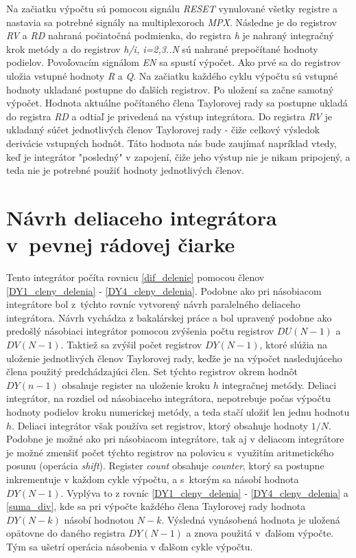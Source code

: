 Na začiatku výpočtu sú pomocou signálu \textit{RESET} vynulované všetky registre a nastavia sa potrebné signály na multiplexoroch \textit{MPX}. Následne je do registrov \textit{RV} a \textit{RD} nahraná počiatočná podmienka, do registra \textit{h} je nahraný integračný krok metódy a do registrov \textit{h/i, i=2,3..N} sú nahrané prepočítané hodnoty podielov. Povoľovacím signálom \textit{EN} sa spustí výpočet. Ako prvé sa do registrov uložia vstupné hodnoty \textit{R} a \textit{Q}. Na začiatku každého cyklu výpočtu sú vstupné hodnoty ukladané postupne do ďalších registrov. Po uložení sa začne samotný výpočet. Hodnota aktuálne počítaného člena Taylorovej rady sa postupne ukladá do registra \textit{RD} a odtiaľ je privedená na výstup integrátora.
Do registra \textit{RV} je ukladaný súčet jednotlivých členov Taylorovej rady - čiže celkový výsledok derivácie vstupných hodnôt. Táto hodnota nás bude zaujímať napríklad vtedy, keď je integrátor "posledný" v zapojení, čiže jeho výstup nie je nikam pripojený, a teda nie je potrebné použiť hodnoty jednotlivých členov.


\section{Návrh deliaceho integrátora v~pevnej rádovej čiarke}
Tento integrátor počíta rovnicu \eqref{dif_delenie} pomocou členov \eqref{DY1_cleny_delenia} - \eqref{DY4_cleny_delenia}. Podobne ako pri násobiacom integrátore bol z~týchto rovníc vytvorený návrh paralelného deliaceho integrátora. Návrh vychádza z bakalárskej práce \cite{MatecnyBP} a bol upravený podobne ako predošlý násobiaci integrátor pomocou zvýšenia počtu registrov $ DU(N-1) $ a $ DV(N-1) $. Taktiež sa zvýšil počet registrov $ DY(N-1) $, ktoré slúžia na uloženie jednotlivých členov Taylorovej rady, keďže je na výpočet nasledujúceho člena použitý predchádzajúci člen. Set týchto registrov okrem hodnôt $ DY(n-1) $ obsahuje register na uloženie kroku $ h $ integračnej metódy. Deliaci integrátor, na rozdiel od násobiaceho integrátora, nepotrebuje počas výpočtu hodnoty podielov kroku numerickej metódy, a teda stačí uložiť len jednu hodnotu $ h $. Deliaci integrátor však používa set registrov, ktorý obsahuje hodnoty $ 1/N $. Podobne je možné ako pri násobiacom integrátore, tak aj v deliacom integrátore je možné zmenšiť počet týchto registrov na polovicu s~využitím aritmetického posunu (operácia \textit{shift}). Register \textit{count} obsahuje \textit{counter}, ktorý sa postupne inkrementuje v každom cykle výpočtu, a s~ktorým sa násobí hodnota $ DY(N-1) $. Vyplýva to z rovníc \eqref{DY1_cleny_delenia} - \eqref{DY4_cleny_delenia} a \eqref{suma_div}, kde sa pri výpočte každého člena Taylorovej rady hodnota $ DY(N - k) $ násobí hodnotou $ N - k $. Výsledná vynásobená hodnota je uložená opätovne do daného registra $ DY(N-1) $ a znova použitá v~ďalšom výpočte. Tým sa ušetrí operácia násobenia v ďalšom cykle výpočtu.

